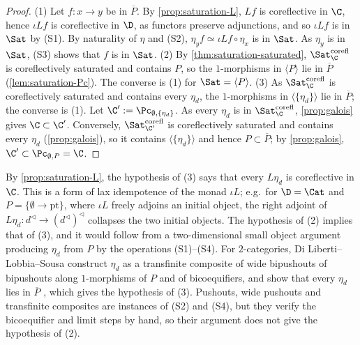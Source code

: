 \begin{proof}
(1) Let $f\colon x \to y$ be in $\overline{P}$. By \cref{prop:saturation-L}, $Lf$ is coreflective in $\C$, hence $\iota Lf$ is coreflective in $\D$, as functors preserve adjunctions, and so $\iota Lf$ is in $\Sat$ by (S1). By naturality of $\eta$ and (S2), $\eta_{y}f \simeq \iota Lf \circ \eta_{x}$ is in $\Sat$. As $\eta_{y}$ is in $\Sat$, (S3) shows that $f$ is in $\Sat$.
(2) By \cref{thm:saturation-saturated}, $\Sat^{\mathrm{corefl}}_{\C}$ is coreflectively saturated and contains $P$, so the $1$-morphisms in $\langle P \rangle$ lie in $\overline{P}$ (\cref{lem:saturation-Pc}). The converse is (1) for $\Sat = \langle P \rangle$.
(3) As $\Sat^{\mathrm{corefl}}_{\C}$ is coreflectively saturated and contains every $\eta_{d}$, the $1$-morphisms in $\langle \{\eta_{d}\} \rangle$ lie in $\overline{P}$; the converse is (1). Let $\C' := \Pc_{\emptyset,\{\eta_{d}\}}$. As every $\eta_{d}$ is in $\Sat^{\mathrm{corefl}}_{\C}$, \cref{prop:galois} gives $\C \subset \C'$. Conversely, $\Sat^{\mathrm{corefl}}_{\C'}$ is coreflectively saturated and contains every $\eta_{d}$ (\cref{prop:galois}), so it contains $\langle \{\eta_{d}\} \rangle$ and hence $P \subset \overline{P}$; by \cref{prop:galois}, $\C' \subset \Pc_{\emptyset,P} = \C$.
\end{proof}

\begin{rmk}
\label{rmk:sat-units-kz}
By \cref{prop:saturation-L}, the hypothesis of (3) says that every $L\eta_{d}$ is coreflective in $\C$. This is a form of lax idempotence of the monad $\iota L$; e.g.\ for $\D = \Cat$ and $P = \{\emptyset \to \mathrm{pt}\}$, where $\iota L$ freely adjoins an initial object, the right adjoint of $L\eta_{d}\colon d^{\triangleleft} \to (d^{\triangleleft})^{\triangleleft}$ collapses the two initial objects.
The hypothesis of (2) implies that of (3), and it would follow from a two-dimensional small object argument producing $\eta_{d}$ from $P$ by the operations (S1)--(S4).
For $2$-categories, Di Liberti--Lobbia--Sousa \cite[Thm.~4.3]{dilibertilobbiasousa2022kz} construct $\eta_{d}$ as a transfinite composite of wide bipushouts of bipushouts along $1$-morphisms of $P$ and of bicoequifiers, and show that every $\eta_{d}$ lies in $\overline{P}$ \cite[Lemma~3.5]{dilibertilobbiasousa2022kz}, which gives the hypothesis of (3). Pushouts, wide pushouts and transfinite composites are instances of (S2) and (S4), but they verify the bicoequifier and limit steps by hand, so their argument does not give the hypothesis of (2).
\end{rmk}


